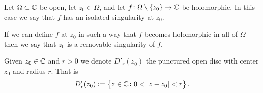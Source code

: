 \documentclass[11pt,a4paper]{article}
\begin{document}
\begin{definition}
  Let $\Omega \subset \mathbb{C}$ be open,
  let $z_0 \in \Omega$,
  and let $f \colon \Omega \setminus \left\{z_0\right\} \to \mathbb{C}$ be holomorphic.
  In this case we say that $f$ has an isolated singularity at $z_0$.
\end{definition}
\begin{remark}
  If we can define $f$ at $z_0$ in such a way that $f$ becomes holomorphic
  in all of $\Omega$ then we say that $z_0$ is a removable singularity of $f$.
\end{remark}

\begin{definition}
  Given $z_0 \in \mathbb{C}$ and $r > 0$ we denote $D'_r(z_0)$ the punctured open disc
  with center $z_0$ and radius $r$.
  That is
  \[
    D'_r(z_0) := \left\{z \in \mathbb{C} \colon 0 < |z - z_0| < r\right\}.
  \]
\end{definition}
\end{document}
